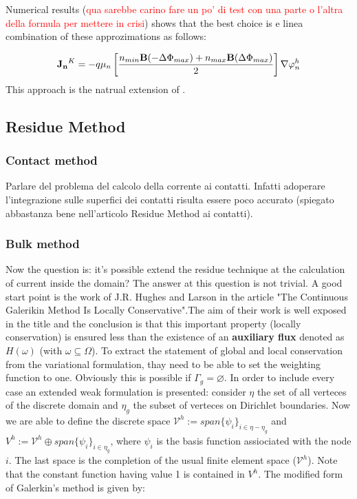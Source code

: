 Numerical results (\textcolor{red}{qua sarebbe carino fare un po' di test con una parte o l'altra della formula per mettere in crisi}) shows that the best choice is e linea combination of these approzimations as follows:

\begin{equation}
\label{eq: first formula for J}
\mathbf{J_n}^K = -  q \mu_n  \left[ \dfrac{ n_{min} \mathbf{B}(-\Delta \Phi_{max})  + n_{max}\mathbf{B}(\Delta \Phi_{max})}{2} \right]\nabla \varphi_n^h
\end{equation}
This approach is the natrual extension of .




\subsection{Residue Method}
\subsubsection{Contact method}
Parlare del problema del calcolo della corrente ai contatti. Infatti adoperare l'integrazione sulle superfici dei contatti risulta essere poco accurato (spiegato abbastanza bene nell'articolo Residue Method ai contatti). 

\subsubsection{Bulk method}
Now the question is: it's possible extend the residue technique at the calculation of current inside the domain? The answer at this question is not trivial. A good start point is the work of J.R. Hughes and Larson in the article "The Continuous Galerikin Method Is Locally Conservative".The aim of their work is well exposed in the title and the conclusion is that this important property (locally conservation) is ensured less than the existence of an \textbf{auxiliary flux} denoted as $H(\omega)$ (with $\omega \subseteq\Omega$). 
To extract the statement of global and local conservation from the variational formulation, thay need to be able to set the weighting function to one. Obviously this is possible if $\Gamma_g=\varnothing$. In order to include every case an extended weak formulation is presented: consider $\eta$ the set of all verteces of the discrete domain and $\eta_g$ the subset of verteces on Dirichlet boundaries.
Now we are able to define the discrete space $\mathcal{V}^h:=span\{\psi_i\}_{i\in \eta - \eta_g} $ and  $V^h:=\mathcal{V}^h \oplus span\{\psi_i\}_{i\in \eta_g}$, where $\psi_i$ is the basis function assiociated with the node $i$.
The last space is the completion of the usual finite element space ($\mathcal{V}^h$). Note that the constant function having value 1 is contained in $V^h$. The modified form of Galerkin's method is given by:

